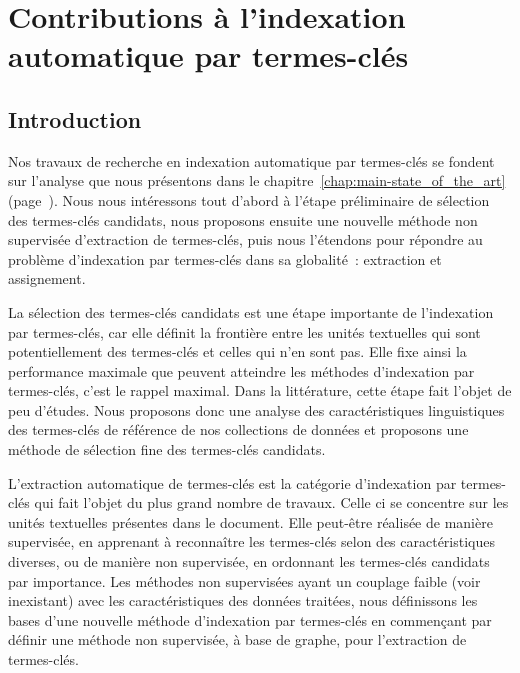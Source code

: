\chapter{Contributions à l'indexation automatique par termes-clés}
\label{chap:main-automatic_keyphrase_annotation}

  \section{Introduction}
  \label{sec:main-automatic_keyphrase_annotation-introduction}
    Nos travaux de recherche en indexation automatique par termes-clés se
    fondent sur l'analyse que nous présentons dans le
    chapitre~\ref{chap:main-state_of_the_art}
    (page~\pageref{chap:main-state_of_the_art}). Nous nous intéressons tout
    d'abord à l'étape préliminaire de sélection des termes-clés candidats, nous
    proposons ensuite une nouvelle méthode non supervisée d'extraction de
    termes-clés, puis nous l'étendons pour répondre au problème d'indexation par
    termes-clés dans sa globalité~: extraction et assignement.

    La sélection des termes-clés candidats est une étape importante de
    l'indexation par termes-clés, car elle définit la frontière entre les unités
    textuelles qui sont potentiellement des termes-clés et celles qui n'en sont
    pas. Elle fixe ainsi la performance maximale que peuvent atteindre les
    méthodes d'indexation par termes-clés, c'est le rappel maximal. Dans la
    littérature, cette étape fait l'objet de peu d'études. Nous proposons donc
    une analyse des caractéristiques linguistiques des termes-clés de référence
    de nos collections de données et proposons une méthode de sélection fine des
    termes-clés candidats.

    L'extraction automatique de termes-clés est la catégorie d'indexation par
    termes-clés qui fait l'objet du plus grand nombre de travaux. Celle ci se
    concentre sur les unités textuelles présentes dans le document. Elle
    peut-être réalisée de manière supervisée, en apprenant à reconnaître les
    termes-clés selon des caractéristiques diverses, ou de manière non
    supervisée, en ordonnant les termes-clés candidats par importance. Les
    méthodes non supervisées ayant un couplage faible (voir inexistant) avec les
    caractéristiques des données traitées, nous définissons les bases d'une
    nouvelle méthode d'indexation par termes-clés en commençant par définir une
    méthode non supervisée, à base de graphe, pour l'extraction de termes-clés.

